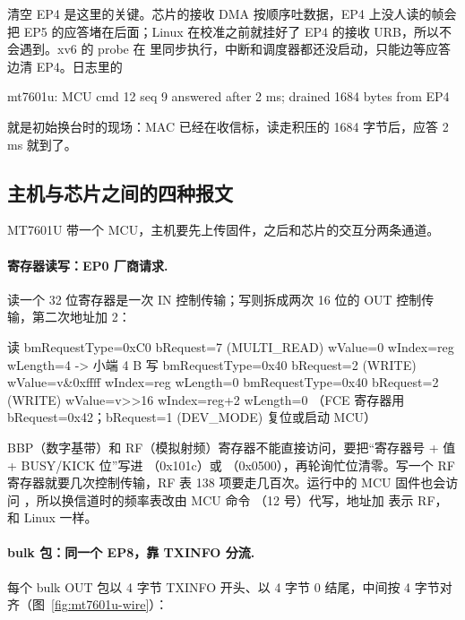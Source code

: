 清空 EP4 是这里的关键。芯片的接收 DMA 按顺序吐数据，EP4 上没人读的帧会把 EP5 的应答堵在后面；Linux 在校准之前就挂好了 EP4 的接收 URB，所以不会遇到。xv6 的 probe 在  里同步执行，中断和调度器都还没启动，只能边等应答边清 EP4。日志里的
\begin{txtcode}
mt7601u: MCU cmd 12 seq 9 answered after 2 ms; drained 1684 bytes from EP4
\end{txtcode}
就是初始换台时的现场：MAC 已经在收信标，读走积压的 1684 字节后，应答 2\,ms 就到了。

\subsection{主机与芯片之间的四种报文}
\label{sec:mt7601u-wire}

MT7601U 带一个 MCU，主机要先上传固件，之后和芯片的交互分两条通道。

\paragraph{寄存器读写：EP0 厂商请求.} 读一个 32 位寄存器是一次 IN 控制传输；写则拆成两次 16 位的 OUT 控制传输，第二次地址加 2：

\begin{txtcode}
读  bmRequestType=0xC0  bRequest=7 (MULTI_READ)  wValue=0       wIndex=reg    wLength=4  -> 小端 4 B
写  bmRequestType=0x40  bRequest=2 (WRITE)       wValue=v&0xffff wIndex=reg    wLength=0
    bmRequestType=0x40  bRequest=2 (WRITE)       wValue=v>>16    wIndex=reg+2  wLength=0
    （FCE 寄存器用 bRequest=0x42；bRequest=1 (DEV_MODE) 复位或启动 MCU）
\end{txtcode}

BBP（数字基带）和 RF（模拟射频）寄存器不能直接访问，要把“寄存器号 + 值 + BUSY/KICK 位”写进 （0x101c）或 （0x0500），再轮询忙位清零。写一个 RF 寄存器就要几次控制传输，RF 表 138 项要走几百次。运行中的 MCU 固件也会访问 ，所以换信道时的频率表改由 MCU 命令 （12 号）代写，地址加  表示 RF，和 Linux 一样。

\paragraph{bulk 包：同一个 EP8，靠 TXINFO 分流.} 每个 bulk OUT 包以 4 字节 TXINFO 开头、以 4 字节 0 结尾，中间按 4 字节对齐（图~\ref{fig:mt7601u-wire}）：

